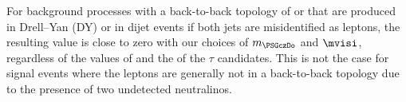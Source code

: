 
For background processes with a back-to-back topology of \tauTau  or \leptonTau  that are produced in Drell--Yan (DY) or in dijet events if both jets 
are misidentified as leptons, the resulting \mttwo value is close to zero with our choices of $m_{\PSGczDo}$ and $\mvisi$, regardless of the values of 
\MPT and the \PT of  the $\tau$ candidates. This is not the case for signal events where the leptons are generally not in a back-to-back topology due 
to the presence of two undetected neutralinos.
